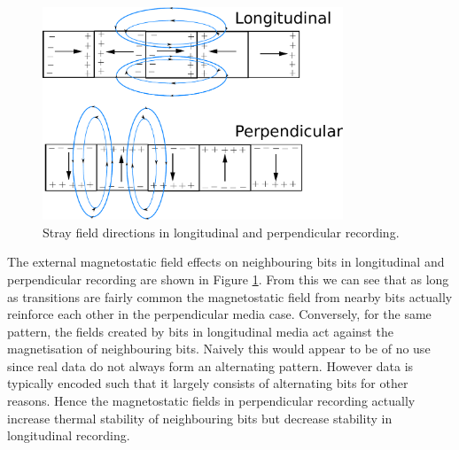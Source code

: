 \begin{figure}
  \center
  \includegraphics[width=0.8\textwidth]{./images/strayfielddiffs}
  \caption{Stray field directions in longitudinal and perpendicular
    recording.}
  \label{fig:Stray-field-directions}
\end{figure}

The external magnetostatic field effects on neighbouring bits in longitudinal
and perpendicular recording are shown in Figure
\ref{fig:Stray-field-directions}. From this we can see that as long as
transitions are fairly common the magnetostatic field from nearby bits actually
reinforce each other in the perpendicular media case. Conversely, for the same
pattern, the fields created by bits in longitudinal media act against the
magnetisation of neighbouring bits. Naively this would appear to be of no use
since real data do not always form an alternating pattern. However data is
typically encoded such that it largely consists of alternating bits for other
reasons. Hence the magnetostatic fields in perpendicular recording actually
increase thermal stability of neighbouring bits but decrease stability in
longitudinal recording.


